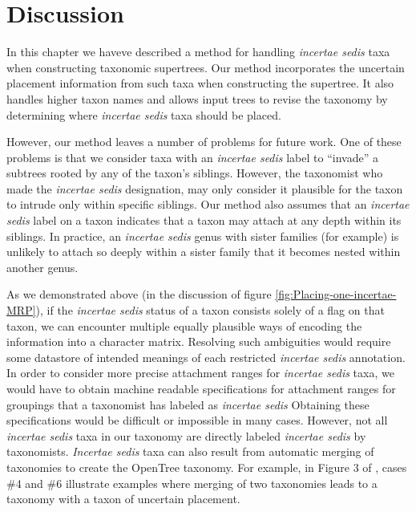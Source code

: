\documentclass[english]{article}
\begin{document}
\section{Discussion}

In this chapter we haveve described a method for handling \emph{incertae sedis} taxa
when constructing taxonomic supertrees.
Our method incorporates the uncertain
placement information from such taxa when constructing the supertree.
It also
handles higher taxon names and allows input trees to revise the taxonomy by
determining where \emph{incertae sedis} taxa should be placed.

However, our method leaves a number of problems for future work.
One of these
problems is that we consider taxa with an \emph{incertae sedis} label to 
``invade'' a subtrees rooted by any of the taxon's siblings.  
However,
the taxonomist who made the \emph{incertae sedis} designation,
may only consider it plausible for the taxon to intrude only within specific
siblings.
Our method also assumes that an \emph{incertae sedis} label on a taxon
indicates that a taxon may attach at any depth within its siblings.  In practice, an
\emph{incertae sedis} genus with sister families (for example) is unlikely to attach
so deeply within a sister family that it becomes nested within another genus.

As we demonstrated above (in the discussion of figure \ref{fig:Placing-one-incertae-MRP}),
if the \emph{incertae sedis} status of a taxon consists solely of
    a flag on that taxon, we can encounter 
    multiple equally plausible ways of encoding the information
    into a character matrix.
Resolving such ambiguities would require some datastore of intended
    meanings of each restricted \emph{incertae sedis} annotation.
In order to consider more precise attachment ranges for \emph{incertae sedis} taxa,
    we would have to obtain machine readable specifications for attachment ranges
    for groupings that a taxonomist has labeled as \emph{incertae sedis}
Obtaining these specifications would be difficult or impossible in many cases.
However,  not all \emph{incertae sedis} taxa in our taxonomy are directly
labeled \emph{incertae sedis} by taxonomists.
\emph{Incertae sedis}
taxa can also result from automatic merging of taxonomies to create
the OpenTree taxonomy.
For example, in Figure 3 of
\citet{rees2017automated}, cases \#4 and \#6 illustrate examples where
merging of two taxonomies leads to a taxonomy with a taxon of
uncertain placement.
\end{document}
